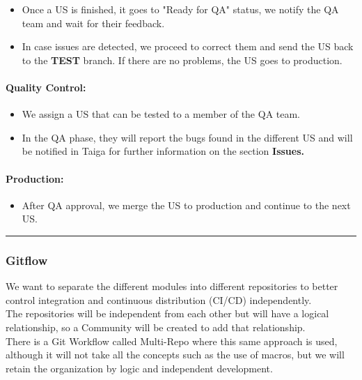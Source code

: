 \begin{itemize}
\tightlist
\item
  Once a US is finished, it goes to "Ready for QA" status, we notify the
  QA team and wait for their feedback.
\item
  In case issues are detected, we proceed to correct them and send the
  US back to the \textbf{TEST} branch. If there are no problems, the US
  goes to production.
\end{itemize}

\hypertarget{qualitycontrolnbsp}{
\paragraph{Quality Control:~}\label{qualitycontrolnbsp}}

\begin{itemize}
\tightlist
\item
  We assign a US that can be tested to a member of the QA team.
\item
  In the QA phase, they will report the bugs found in the different US
  and will be notified in Taiga for further information on the section
  \textbf{Issues.}
\end{itemize}

\hypertarget{productionnbsp}{
\paragraph{Production:~}\label{productionnbsp}}

\begin{itemize}
\tightlist
\item
  After QA approval, we merge the US to production and continue to the
  next US.
\end{itemize}

\begin{center}\rule{0.5\linewidth}{0.5pt}\end{center}

\hypertarget{gitflow}{
\subsubsection{Gitflow}\label{gitflow}}

We want to separate the different modules into different repositories to
better control integration and continuous distribution (CI/CD)
independently.\\
The repositories will be independent from each other but will have a
logical relationship, so a Community will be created to add that
relationship.\\
There is a Git Workflow called Multi-Repo where this same approach is
used, although it will not take all the concepts such as the use of
macros, but we will retain the organization by logic and independent
development.~


